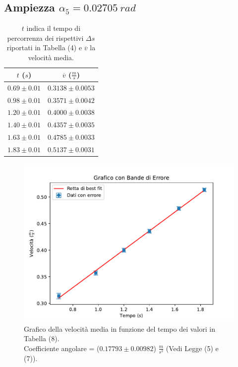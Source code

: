 \documentclass[11pt]{article}
\begin{document}
\subsection{Ampiezza $\alpha_5=0.02705\ rad$}
\begin{table}[H]
\centering
\begin{tabular}{|c|c|}
\hline
\textbf{$t$ ($s$)} & \textbf{$\overline{v}$ ($\frac{m}{s}$)} \\
\hline
$0.69\pm 0.01$ & $0.3138\pm 0.0053$ \\
$0.98\pm 0.01$ & $0.3571\pm 0.0042$ \\
$1.20\pm 0.01$ & $0.4000\pm 0.0038$ \\
$1.40\pm 0.01$ & $0.4357\pm 0.0035$ \\
$1.63\pm 0.01$ & $0.4785\pm 0.0033$ \\
$1.83\pm 0.01$ & $0.5137\pm 0.0031$ \\
\hline
\end{tabular}
\caption{$t$ indica il tempo di percorrenza dei rispettivi $\Delta s$ riportati in Tabella (4) e $\overline{v}$ la velocità media.}
\label{tab:}
\end{table}
\begin{figure}[H]
  \centering
  \includegraphics[width=1\textwidth]{grafico5p1.pdf}
  \caption{Grafico della velocità media in funzione del tempo dei valori in Tabella (8). \\
    Coefficiente angolare = ($0.17793\pm 0.00982$) $\frac{m}{s^2}$ (Vedi Legge (5) e (7)).}
\end{figure}
\end{document}
